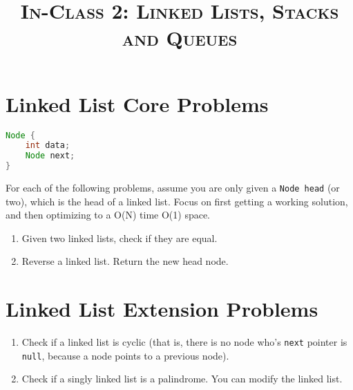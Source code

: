\documentclass{article}
\title{\large{\textsc{In-Class 2: Linked Lists, Stacks and Queues}}}
\date{}
\begin{document}
\maketitle

\section*{Linked List Core Problems}

\begin{lstlisting}[language=Java]
Node {
    int data;
    Node next;
}

\end{lstlisting}

\noindent For each of the following problems, assume you are only given a \texttt{Node head} (or two), which is the head of a linked list. Focus on first getting a working solution, and then optimizing to a O(N) time O(1) space.

\begin{enumerate}

\setcounter{enumi}{0}

\item Given two linked lists, check if they are equal.

\item Reverse a linked list. Return the new head node.

\end{enumerate}

\section*{Linked List Extension Problems}

\begin{enumerate}

\setcounter{enumi}{0}

\item Check if a linked list is cyclic (that is, there is no node who's \texttt{next} pointer is \texttt{null}, because a node points to a previous node).

\item Check if a singly linked list is a palindrome. You can modify the linked list.

\end{enumerate}

\subsection*{}
\end{document}
